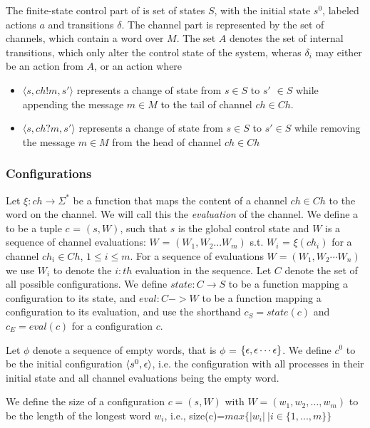 The finite-state control part of  is set of states $S$, with the initial state $s^0$, labeled actions $a$ and transitions $\delta$. The channel part is represented by the set  of channels, which contain a word over $M$. The set $A$ denotes the set of internal transitions, which only alter the control state of the system, wheras $\delta_i$ may either be an action from $A$, or an action where

\begin{itemize}
\item[]
$\langle s, ch!m, s'\rangle$ represents a change of state from $s \in S$ to $s'$ $\in S$ while appending the message $m\in M$ to the tail of channel $ch\in Ch$.
\item[]
$\langle s, ch?m, s'\rangle$ represents a change of state from $s\in S$ to $s'\in S$ while removing the message $m\in M$ from the head of channel $ch \in Ch$
\end{itemize}

\subsubsection{Configurations}
Let $\xi : ch \rightarrow \Sigma^*$ be a function that maps the content of a channel $ch \in Ch$ to the word on the channel. We will call this the \emph{evaluation} of the channel. We define a  to be a tuple $c$ = $(s, W)$, such that $s$ is the global control state and $W$ is a sequence of channel evaluations: $W$ = $(W_1, W_2...W_m)$ s.t. $W_i$ = $\xi(ch_i)$ for a channel $ch_i \in Ch$, $1 \leq i \leq m$.
For a sequence of evaluations $W = (W_1, W_2 \cdots W_n)$ we use $W_i$ to denote the $i:th$ evaluation in the sequence.
Let $C$ denote the set of all possible configurations. We define $state : C \rightarrow S$ to be a function mapping a configuration to its state, and $eval : C -> W$ to be a function mapping a configuration to its evaluation, and use the shorthand $c_{S} = state(c)$ and $c_{E} = eval(c)$ for a configuration $c$.

Let $\phi$ denote a sequence of empty words, that is $\phi$ = $\left\{\epsilon,\epsilon\cdots\epsilon\right\}$. We define $c^0$ to be the initial configuration $\langle s^0, \bf\epsilon\rangle$, i.e. the configuration with all processes in their initial state and all channel evaluations being the empty word.

We define the size of a configuration $c = (s,W)$ with $W=(w_1,w_2,\ldots,w_m)$ to be the length of the longest word $w_i$, i.e., size(c)=$max\{|w_i|~| i \in \{1, ...,m\}\}$

